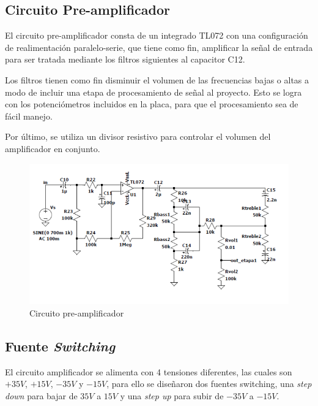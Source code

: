 \subsection{Circuito Pre-amplificador}

\par El circuito pre-amplificador consta de un integrado TL072 con una configuración de realimentación paralelo-serie, que tiene como fin, amplificar la señal de entrada para ser tratada mediante los filtros siguientes al capacitor C12.\\

\par Los filtros tienen como fin disminuir el volumen de las frecuencias bajas o altas a modo de incluir una etapa de procesamiento de señal al proyecto. Esto se logra con los potenciómetros incluidos en la placa, para que el procesamiento sea de fácil manejo.\\

\par Por último, se utiliza un divisor resistivo para controlar el volumen del amplificador en conjunto.\\

\begin{figure}[H]
    \centering
    \includegraphics[scale=.7]{img/circuito/pre_amplificador.PNG}
    \caption{Circuito pre-amplificador}
    \label{fig:ciruito_pre}
\end{figure}

\subsection{Fuente \textit{Switching}}

\par El circuito amplificador se alimenta con 4 tensiones diferentes, las cuales son $+35V$, $+15V$, $-35V$ y $-15V$, para ello se diseñaron dos fuentes switching, una \textit{step down} para bajar de $35V$ a $15V$ y una \textit{step up} para subir de $-35V$ a $-15V$.\\

